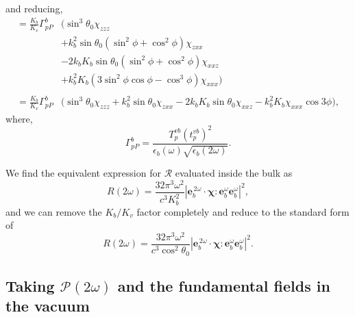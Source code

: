 and reducing,
\begin{equation*}
\begin{split}
=
\frac{K_{b}}{K_{v}}
\Gamma^{b}_{pP}
&\big(
   \sin^{3}\theta_{0}\chi_{zzz}\\
&+ k^{2}_{b}\sin\theta_{0}(\sin^{2}\phi + \cos^{2}\phi)\chi_{zxx}\\
&- 2k_{b}K_{b}\sin\theta_{0}(\sin^{2}\phi + \cos^{2}\phi)\chi_{xxz}\\
&+ k^{2}_{b}K_{b}(3\sin^{2}\phi\cos\phi - \cos^{3}\phi)\chi_{xxx}
\big)\\\\
=
\frac{K_{b}}{K_{v}}
\Gamma^{b}_{pP}
&\big(
  \sin^{3}\theta_{0}\chi_{zzz} 
+ k^{2}_{b}\sin\theta_{0}\chi_{zxx}
- 2k_{b}K_{b}\sin\theta_{0}\chi_{xxz}
- k^{2}_{b}K_{b}\chi_{xxx}\cos3\phi
\big),
\end{split}
\end{equation*}
where,
\begin{equation*}
\Gamma^{b}_{pP} =
\frac{T_{p}^{vb}\left(t^{vb}_{p}\right)^{2}}
     {\epsilon_{b}(\omega)\sqrt{\epsilon_{b}(2\omega)}}.
\end{equation*}

We find the equivalent expression for $\mathcal{R}$ evaluated inside the bulk
as
\begin{equation*}
R(2\omega) =
\frac{32\pi^{3} \omega^{2}}{c^{3}K^{2}_{b}}
\left\vert
\mathbf{e}^{\,2\omega}_{b}\cdot\boldsymbol{\chi}:
\mathbf{e}^{\omega}_{b}\mathbf{e}^{\omega}_{b}
\right\vert^{2} 
,
\end{equation*}
and we can remove the $K_{b}/K_{v}$ factor completely and reduce to the
standard form of
\begin{equation*}
R(2\omega) =
\frac{32\pi^{3} \omega^{2}}{c^{3}\cos^{2}\theta_{0}}
\left\vert
\mathbf{e}^{\,2\omega}_{b}\cdot\boldsymbol{\chi}:
\mathbf{e}^{\omega}_{b}\mathbf{e}^{\omega}_{b}
\right\vert^{2}.
\end{equation*}


\subsection{Taking \texorpdfstring{$\mathcal{P}(2\omega)$}{P(2w)} and the
fundamental fields in the vacuum}

